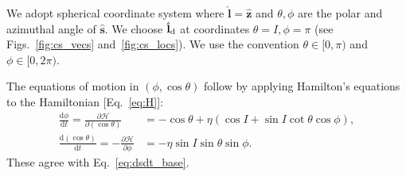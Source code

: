 \documentclass[twocolumn,twocolappendix]{aastex63}
\newcommand*{\rd}[2]{\frac{\mathrm{d}#1}{\mathrm{d}#2}}
\newcommand*{\pd}[2]{\frac{\partial#1}{\partial#2}}
\newcommand*{\bsmb}[1]{\boldsymbol{\mathbf{#1}}}
\newcommand*{\uv}[1]{\hat{\bsmb{#1}}}
\newcommand*{\p}[1]{\left(#1\right)}
\begin{document}
We adopt spherical coordinate system where $\uv{l} =
\uv{z}$ and $\theta, \phi$ are the polar and azimuthal angle of $\uv{s}$. We
choose $\uv{l}_{\rm d}$ at coordinates $\theta = I, \phi = \pi$ (see
Figs.~\ref{fig:cs_vecs} and~\ref{fig:cs_locs}). We use the convention
$\theta \in [0, \pi)$ %
and $\phi \in [0, 2\pi)$.%

The equations of motion in $\p{\phi, \cos \theta}$ follow by
applying Hamilton's equations to the Hamiltonian [Eq.~\eqref{eq:H}]:
\begin{subequations}\label{se:H_eom}
    \begin{align}
        \rd{\phi}{t} = \pd{\mathcal{H}}{(\cos\theta)}
            &= -\cos\theta + \eta\p{\cos I + \sin I \cot \theta \cos \phi},
                \label{seq:H_eom_phi_t}\\
        \rd{(\cos \theta)}{t} = -\pd{\mathcal{H}}{\phi}
            &= -\eta \sin I \sin \theta \sin \phi.
                \label{seq:H_eom_mu_t}
    \end{align}
\end{subequations}
These agree with Eq.~\eqref{eq:dsdt_base}.

\end{document}
